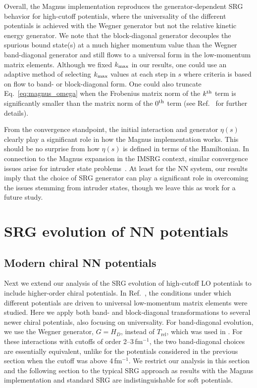 \documentclass[10pt,aps,prc,floatfix,twocolumn,nofootinbib]{revtex4-1}
\newcommand{\Trel}{\ensuremath{T_{\textrm{rel}}}}
\begin{document}
Overall, the Magnus implementation reproduces the generator-dependent SRG behavior for high-cutoff potentials, where the universality of the different potentials is achieved with the Wegner generator but not the relative kinetic energy generator.
We note that the block-diagonal generator decouples the spurious bound state(s) at a much higher momentum value than the Wegner band-diagonal generator and still flows to a universal form in the low-momentum matrix elements.
Although we fixed $k_{\rm max}$ in our results, one could use an adaptive method of selecting $k_{\rm max}$ values at each step in $s$ where criteria is based on flow to band- or block-diagonal form.
One could also truncate Eq.~\eqref{eq:magnus_omega} when the Frobenius matrix norm of the $k^{\rm th}$ term is significantly smaller than the matrix norm of the $0^{\rm th}$ term (see Ref.~\cite{Morris:2015yna} for further details).


From the convergence standpoint, the initial interaction and generator $\eta(s)$ clearly play a significant role in how the Magnus implementation works.
This should be no surprise from how $\eta(s)$ is defined in terms of the Hamiltonian.
In connection to the Magnus expansion in the IMSRG context, similar convergence issues arise for intruder state problems~\cite{Stroberg:2019mxo}.
At least for the NN system, our results imply that the choice of SRG generator can play a significant role in overcoming the issues stemming from intruder states, though we leave this as work for a future study.


\section{SRG evolution of NN potentials}
\label{sec:srg_evolution_nn_potentials}


\subsection{Modern chiral NN potentials}
\label{subsec:modern_chiral}


Next we extend our analysis of the SRG evolution of high-cutoff LO potentials to include higher-order chiral potentials.
In Ref.~\cite{Dainton:2013axa}, the conditions under which different potentials are driven to universal low-momentum matrix elements were studied.
Here we apply both band- and block-diagonal transformations to several newer chiral potentials, also focusing on universality.
For band-diagonal evolution, we use the Wegner generator, $G=H_D$, instead of \Trel, which was used in \cite{Dainton:2013axa}.
For these interactions with cutoffs of order 2--3\,fm$^{-1}$, the two band-diagonal choices are essentially equivalent, unlike for the potentials considered in the previous section when the cutoff was above 4\,fm$^{-1}$.
We restrict our analysis in this section and the following section to the typical SRG approach as results with the Magnus implementation and standard SRG are indistinguishable for soft potentials.
\end{document}
